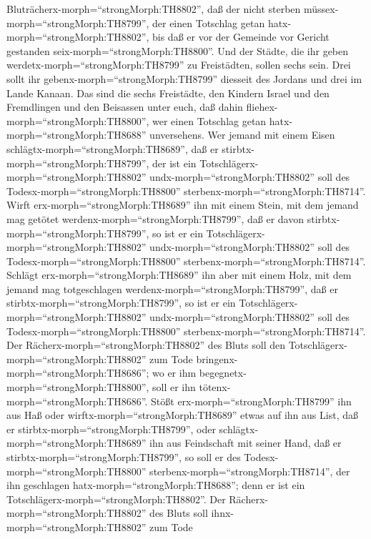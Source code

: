 Bluträcherx-morph=``strongMorph:TH8802'', daß der nicht sterben
müssex-morph=``strongMorph:TH8799'', der einen Totschlag getan
hatx-morph=``strongMorph:TH8802'', bis daß er vor der Gemeinde vor
Gericht gestanden seix-morph=``strongMorph:TH8800''.  Und
der Städte, die ihr geben werdetx-morph=``strongMorph:TH8799'' zu
Freistädten, sollen sechs sein.  Drei sollt ihr
gebenx-morph=``strongMorph:TH8799'' diesseit des Jordans und drei im
Lande Kanaan.  Das sind die sechs Freistädte, den Kindern
Israel und den Fremdlingen und den Beisassen unter euch, daß dahin
fliehex-morph=``strongMorph:TH8800'', wer einen Totschlag getan
hatx-morph=``strongMorph:TH8688'' unversehens.  Wer jemand
mit einem Eisen schlägtx-morph=``strongMorph:TH8689'', daß er
stirbtx-morph=``strongMorph:TH8799'', der ist ein
Totschlägerx-morph=``strongMorph:TH8802''
undx-morph=``strongMorph:TH8802'' soll des
Todesx-morph=``strongMorph:TH8800''
sterbenx-morph=``strongMorph:TH8714''.  Wirft
erx-morph=``strongMorph:TH8689'' ihn mit einem Stein, mit dem jemand mag
getötet werdenx-morph=``strongMorph:TH8799'', daß er davon
stirbtx-morph=``strongMorph:TH8799'', so ist er ein
Totschlägerx-morph=``strongMorph:TH8802''
undx-morph=``strongMorph:TH8802'' soll des
Todesx-morph=``strongMorph:TH8800''
sterbenx-morph=``strongMorph:TH8714''.  Schlägt
erx-morph=``strongMorph:TH8689'' ihn aber mit einem Holz, mit dem jemand
mag totgeschlagen werdenx-morph=``strongMorph:TH8799'', daß er
stirbtx-morph=``strongMorph:TH8799'', so ist er ein
Totschlägerx-morph=``strongMorph:TH8802''
undx-morph=``strongMorph:TH8802'' soll des
Todesx-morph=``strongMorph:TH8800''
sterbenx-morph=``strongMorph:TH8714''.  Der
Rächerx-morph=``strongMorph:TH8802'' des Bluts soll den
Totschlägerx-morph=``strongMorph:TH8802'' zum Tode
bringenx-morph=``strongMorph:TH8686''; wo er ihm
begegnetx-morph=``strongMorph:TH8800'', soll er ihn
tötenx-morph=``strongMorph:TH8686''.  Stößt
erx-morph=``strongMorph:TH8799'' ihn aus Haß oder
wirftx-morph=``strongMorph:TH8689'' etwas auf ihn aus List, daß er
stirbtx-morph=``strongMorph:TH8799'',  oder
schlägtx-morph=``strongMorph:TH8689'' ihn aus Feindschaft mit seiner
Hand, daß er stirbtx-morph=``strongMorph:TH8799'', so soll er des
Todesx-morph=``strongMorph:TH8800''
sterbenx-morph=``strongMorph:TH8714'', der ihn geschlagen
hatx-morph=``strongMorph:TH8688''; denn er ist ein
Totschlägerx-morph=``strongMorph:TH8802''. Der
Rächerx-morph=``strongMorph:TH8802'' des Bluts soll
ihnx-morph=``strongMorph:TH8802'' zum Tode
